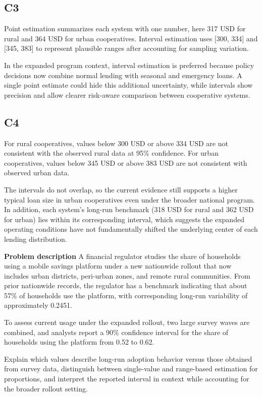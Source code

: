 \begin{ExamProblems}
		\subsection*{C3}
		Point estimation summarizes each system with one number, here 317 USD for rural and 364 USD for urban cooperatives. Interval estimation uses [300, 334] and [345, 383] to represent plausible ranges after accounting for sampling variation.
		
		In the expanded program context, interval estimation is preferred because policy decisions now combine normal lending with seasonal and emergency loans. A single point estimate could hide this additional uncertainty, while intervals show precision and allow clearer risk-aware comparison between cooperative systems.
		
		\subsection*{C4}
		For rural cooperatives, values below 300 USD or above 334 USD are not consistent with the observed rural data at 95\% confidence. For urban cooperatives, values below 345 USD or above 383 USD are not consistent with observed urban data.
		
		The intervals do not overlap, so the current evidence still supports a higher typical loan size in urban cooperatives even under the broader national program. In addition, each system's long-run benchmark (318 USD for rural and 362 USD for urban) lies within its corresponding interval, which suggests the expanded operating conditions have not fundamentally shifted the underlying center of each lending distribution.
		
		\newpage
		\item
		\textbf{Problem description}
		A financial regulator studies the share of households using a mobile savings platform under a new nationwide rollout that now includes urban districts, peri-urban zones, and remote rural communities. From prior nationwide records, the regulator has a benchmark indicating that about 57\% of households use the platform, with corresponding long-run variability of approximately 0.2451.
		
		To assess current usage under the expanded rollout, two large survey waves are combined, and analysts report a 90\% confidence interval for the share of households using the platform from 0.52 to 0.62.
		
		Explain which values describe long-run adoption behavior versus those obtained from survey data, distinguish between single-value and range-based estimation for proportions, and interpret the reported interval in context while accounting for the broader rollout setting.
		

\end{ExamProblems}
